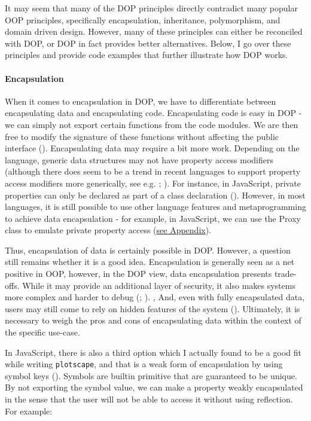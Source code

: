 \documentclass[
]{book}
\theoremstyle{definition}
\theoremstyle{definition}
\theoremstyle{definition}
\theoremstyle{definition}
\theoremstyle{remark}
\begin{document}
It may seem that many of the DOP principles directly contradict many popular OOP principles, specifically encapsulation, inheritance, polymorphism, and domain driven design. However, many of these principles can either be reconciled with DOP, or DOP in fact provides better alternatives. Below, I go over these principles and provide code examples that further illustrate how DOP works.

\paragraph{Encapsulation}\label{encapsulation}

When it comes to encapsulation in DOP, we have to differentiate between encapsulating data and encapsulating code. Encapsulating code is easy in DOP - we can simply not export certain functions from the code modules. We are then free to modify the signature of these functions without affecting the public interface (). Encapsulating data may require a bit more work. Depending on the language, generic data structures may not have property access modifiers (although there does seem to be a trend in recent languages to support property access modifiers more generically, see e.g. ; ). For instance, in JavaScript, private properties can only be declared as part of a class declaration (). However, in most languages, it is still possible to use other language features and metaprogramming to achieve data encapsulation - for example, in JavaScript, we can use the Proxy class to emulate private property access (\hyperref[dop-encapsulation]{see Appendix}).

Thus, encapsulation of data is certainly possible in DOP. However, a question still remains whether it is a good idea. Encapsulation is generally seen as a net positive in OOP, however, in the DOP view, data encapsulation presents trade-offs. While it may provide an additional layer of security, it also makes systems more complex and harder to debug (; ). , And, even with fully encapsulated data, users may still come to rely on hidden features of the system (). Ultimately, it is necessary to weigh the pros and cons of encapsulating data within the context of the specific use-case.

In JavaScript, there is also a third option which I actually found to be a good fit while writing \texttt{plotscape}, and that is a weak form of encapsulation by using symbol keys (). Symbols are builtin primitive that are guaranteed to be unique. By not exporting the symbol value, we can make a property weakly encapsulated in the sense that the user will not be able to access it without using reflection. For example:
\end{document}
